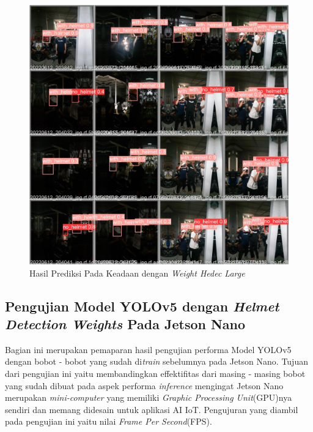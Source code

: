 \begin{figure}[ht]
  \centering
  \includegraphics[scale=0.2]{gambar/train_v2_val/low_ligjt/customLarge/val_batch0_pred.jpg}
  \caption{Hasil Prediksi Pada Keadaan dengan \emph{Weight Hedec Large}}
\end{figure}

\newpage

\subsection{Pengujian Model YOLOv5 dengan \emph{Helmet Detection Weights} Pada Jetson Nano}
\label{subsec:jetsonnano_hedectest}

\par Bagian ini merupakan pemaparan hasil pengujian performa Model YOLOv5 dengan bobot - bobot yang sudah di\emph{train}
sebelumnya pada Jetson Nano. Tujuan dari pengujian ini yaitu membandingkan effektifitas dari masing - masing
bobot yang sudah dibuat pada aspek performa \emph{inference} mengingat Jetson Nano merupakan \emph{mini-computer} yang memiliki
\emph{Graphic Processing Unit}(GPU)nya sendiri dan memang didesain untuk aplikasi AI IoT. Pengujuran yang diambil pada pengujian ini
yaitu nilai \emph{Frame Per Second}(FPS).

